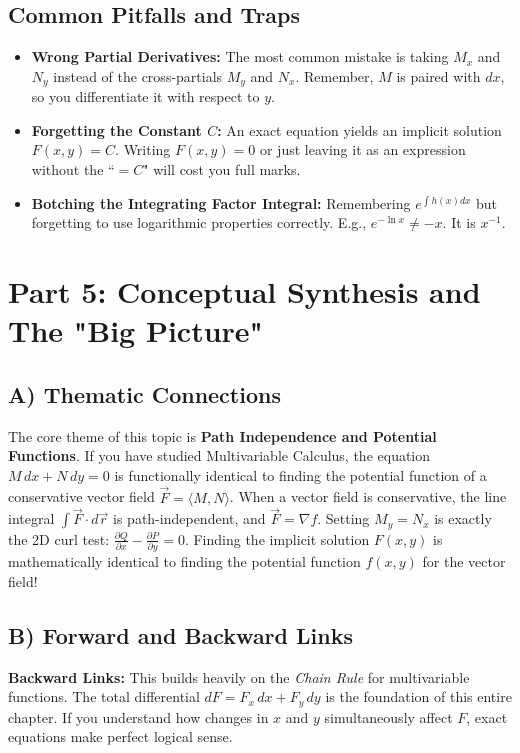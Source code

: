 \documentclass[11pt]{article}
\begin{document}
\subsection{Common Pitfalls and Traps}
\begin{itemize}
    \item \textbf{Wrong Partial Derivatives:} The most common mistake is taking $M_x$ and $N_y$ instead of the cross-partials $M_y$ and $N_x$. Remember, $M$ is paired with $dx$, so you differentiate it with respect to $y$.
    \item \textbf{Forgetting the Constant $C$:} An exact equation yields an implicit solution $F(x,y) = C$. Writing $F(x,y) = 0$ or just leaving it as an expression without the ``$= C$" will cost you full marks.
    \item \textbf{Botching the Integrating Factor Integral:} Remembering $e^{\int h(x)dx}$ but forgetting to use logarithmic properties correctly. E.g., $e^{-\ln x} \neq -x$. It is $x^{-1}$.
\end{itemize}

\newpage
\section{Part 5: Conceptual Synthesis and The "Big Picture"}

\subsection{A) Thematic Connections}
The core theme of this topic is \textbf{Path Independence and Potential Functions}. If you have studied Multivariable Calculus, the equation $M \, dx + N \, dy = 0$ is functionally identical to finding the potential function of a conservative vector field $\vec{F} = \langle M, N \rangle$.
When a vector field is conservative, the line integral $\int \vec{F} \cdot d\vec{r}$ is path-independent, and $\vec{F} = \nabla f$. 
Setting $M_y = N_x$ is exactly the 2D curl test: $\frac{\partial Q}{\partial x} - \frac{\partial P}{\partial y} = 0$. Finding the implicit solution $F(x,y)$ is mathematically identical to finding the potential function $f(x,y)$ for the vector field!

\subsection{B) Forward and Backward Links}
\textbf{Backward Links:} This builds heavily on the \textit{Chain Rule} for multivariable functions. The total differential $dF = F_x \, dx + F_y \, dy$ is the foundation of this entire chapter. If you understand how changes in $x$ and $y$ simultaneously affect $F$, exact equations make perfect logical sense.
\end{document}
